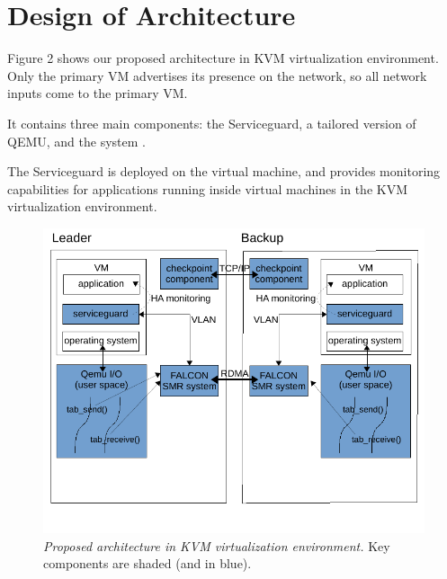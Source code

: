 \section{Design of Architecture} \label{sec:overview}

Figure 2 shows our proposed architecture in KVM virtualization environment. 
Only the primary VM advertises its presence on the network, so all network 
inputs come to the primary VM. 

It contains three main components: the Serviceguard, a tailored version 
of QEMU, and the \smr system \smrsystem. 

The Serviceguard is deployed on the virtual machine, and provides monitoring 
capabilities for applications running inside virtual machines in the KVM 
virtualization environment.

\begin{figure}[t]
\centering
\includegraphics[width=.47\textwidth]{figures/arch}
\vspace{-.2in}
\caption{{\em Proposed architecture in KVM virtualization environment.} Key 
components are shaded (and in blue).} \label{fig:arc}
\vspace{.05in}
\end{figure}
